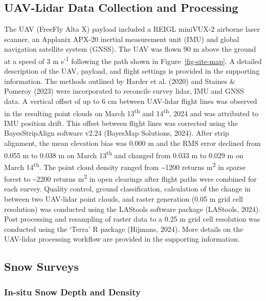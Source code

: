 \documentclass[
  letterpaper,
  DIV=11,
  numbers=noendperiod]{scrartcl}
\begin{document}
\subsection{UAV-Lidar Data Collection and
Processing}\label{uav-lidar-data-collection-and-processing}

The UAV (FreeFly Alta X) payload included a REIGL miniVUX-2 airborne
laser scanner, an Applanix APX-20 inertial measurement unit (IMU) and
global navigation satellite system (GNSS). The UAV was flown 90 m above
the ground at a speed of 3 m s\textsuperscript{-1} following the path
shown in Figure~\ref{fig-site-map}. A detailed description of the UAV,
payload, and flight settings is provided in the supporting information.
The methods outlined by Harder et al. (2020) and Staines \& Pomeroy
(2023) were incorporated to reconcile survey lidar, IMU and GNSS data. A
vertical offset of up to 6 cm between UAV-lidar flight lines was
observed in the resulting point clouds on March 13\textsuperscript{th}
and 14\textsuperscript{th}, 2024 and was attributed to IMU position
drift. This offset between flight lines was corrected using the
BayesStripAlign software v2.24 (BayesMap Solutions, 2024). After strip
alignment, the mean elevation bias was 0.000 m and the RMS error
declined from 0.055 m to 0.038 m on March 13\textsuperscript{th} and
changed from 0.033 m to 0.029 m on March 14\textsuperscript{th}. The
point cloud density ranged from \textasciitilde1200 returns
m\textsuperscript{2} in sparse forest to \textasciitilde2200 returns
m\textsuperscript{2} in open clearings after flight paths were combined
for each survey. Quality control, ground classification, calculation of
the change in between two UAV-lidar point clouds, and raster generation
(0.05 m grid cell resolution) was conducted using the LAStools software
package (LAStools, 2024). Post processing and resampling of raster data
to a 0.25 m grid cell resolution was conducted using the `Terra' R
package (Hijmans, 2024). More details on the UAV-lidar processing
workflow are provided in the supporting information.

\subsection{Snow Surveys}\label{snow-surveys}

\subsubsection{In-situ Snow Depth and
Density}\label{in-situ-snow-depth-and-density}
\end{document}
